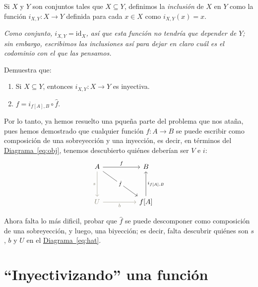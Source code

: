 \documentclass[letterpaper,DIV=14,headsepline,12pt]{scrartcl}
\newcommand{\pts}{}
\newenvironment{ejercicio}[1]{\ifthenelse{\equal{#1}{1} \OR \equal{#1}{+1}}{\renewcommand{\pts}{\textbf{(#1 pt)}}}{\renewcommand{\pts}{\textbf{(#1 pts)}}}\begin{ejj}\upshape \pts}{\end{ejj}}
\newcommand{\id}{\mathrm{id}}
\begin{document}
    \begin{definicion}
        Si $X$ y $Y$ son conjuntos tales que $X \subseteq Y$, definimos la \textit{inclusión} de $X$ en $Y$ como la función $i_{X,Y}:X \to Y$ definida para cada $x \in X$ como $i_{X,Y}(x) = x$.

        \textit{Como conjunto, $i_{X,Y}=\id_X$, así que esta función no tendría que depender de $Y$; sin embargo, escribimos las inclusiones así para dejar en claro cuál es el codominio con el que las pensamos.}
    \end{definicion}

    \begin{ejercicio}{1.5}
        Demuestra que:
        \begin{enumerate}
            \item Si $X \subseteq Y$, entonces $i_{X,Y}:X \to Y$ es inyectiva.
            \item $f=i_{f[A],B} \circ \hat{f}$.
        \end{enumerate}
    \end{ejercicio}

    Por lo tanto, ya hemos resuelto una pqueña parte del problema que nos ataña, pues hemos demostrado que cualquier función $f:A \to B$ se puede escribir como composición de una sobreyección y una inyección, es decir, en términos del \hyperref[eq:obj]{Diagrama~\ref*{eq:obj}}, tenemos descubierto quiénes deberían ser $V$ e $i$:
    \begin{equation}\label{eq:hat}
        \begin{tikzcd}
            A && B \\
            \\
            \textcolor{Cornsilk4}{U} && {f[A]}
            \arrow["f", from=1-1, to=1-3]
            \arrow["s"', from=1-1, to=3-1, draw=Cornsilk4, text=Cornsilk4]
            \arrow["{\hat{f}}"{description}, from=1-1, to=3-3]
            \arrow["b"', from=3-1, to=3-3, draw=Cornsilk4, text=Cornsilk4]
            \arrow["{i_{f[A],B}}"', from=3-3, to=1-3]
        \end{tikzcd}
    \end{equation}

    Ahora falta lo más dificil, probar que $\hat{f}$ se puede descomponer como composición de una sobreyección, y luego, una biyección; es decir, falta descubrir quiénes son $s$, $b$ y $U$ en el \hyperref[eq:hat]{Diagrama~\ref*{eq:hat}}.

    \section*{``Inyectivizando'' una función}
\end{document}

